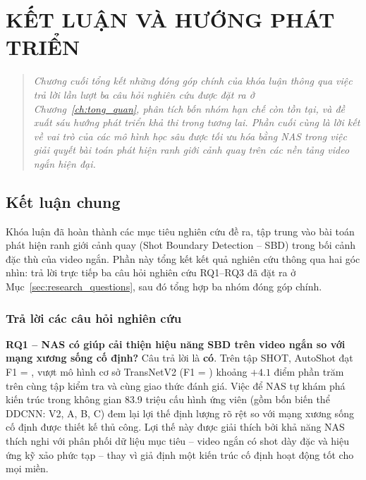 \chapter{KẾT LUẬN VÀ HƯỚNG PHÁT TRIỂN}
\label{chuong6}
\label{ch:ket_luan}

\vspace{-1.5cm}

\begin{quotation}
    \noindent
    \small\itshape
    Chương cuối tổng kết những đóng góp chính của khóa luận thông qua việc trả lời lần lượt ba câu hỏi nghiên cứu được đặt ra ở Chương~\ref{ch:tong_quan}, phân tích bốn nhóm hạn chế còn tồn tại, và đề xuất sáu hướng phát triển khả thi trong tương lai. Phần cuối cùng là lời kết về vai trò của các mô hình học sâu được tối ưu hóa bằng NAS trong việc giải quyết bài toán phát hiện ranh giới cảnh quay trên các nền tảng video ngắn hiện đại.
\end{quotation}
\vspace{1em}

\section{Kết luận chung}
\label{sec:ket_luan}

Khóa luận đã hoàn thành các mục tiêu nghiên cứu đề ra, tập trung vào bài toán phát hiện ranh giới cảnh quay (Shot Boundary Detection -- SBD) trong bối cảnh đặc thù của video ngắn. Phần này tổng kết kết quả nghiên cứu thông qua hai góc nhìn: trả lời trực tiếp ba câu hỏi nghiên cứu RQ1--RQ3 đã đặt ra ở Mục~\ref{sec:research_questions}, sau đó tổng hợp ba nhóm đóng góp chính.

\subsection{Trả lời các câu hỏi nghiên cứu}

\textbf{RQ1 -- NAS có giúp cải thiện hiệu năng SBD trên video ngắn so với mạng xương sống cố định?}
Câu trả lời là \textbf{có}. Trên tập SHOT, AutoShot đạt F1 = \AutoShotOriginalShotFOne, vượt mô hình cơ sở TransNetV2 (F1 = \TransNetShotFOne) khoảng $+4.1$ điểm phần trăm trên cùng tập kiểm tra và cùng giao thức đánh giá. Việc để NAS tự khám phá kiến trúc trong không gian 83.9 triệu cấu hình ứng viên (gồm bốn biến thể DDCNN: V2, A, B, C) đem lại lợi thế định lượng rõ rệt so với mạng xương sống cố định được thiết kế thủ công. Lợi thế này được giải thích bởi khả năng NAS thích nghi với phân phối dữ liệu mục tiêu -- video ngắn có shot dày đặc và hiệu ứng kỹ xảo phức tạp -- thay vì giả định một kiến trúc cố định hoạt động tốt cho mọi miền.

